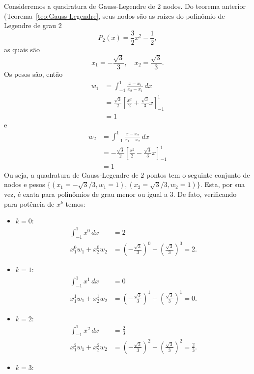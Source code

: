 \begin{ex}
  Consideremos a quadratura de Gauss-Legendre de $2$ nodos. Do teorema anterior (Teorema~\ref{teo:Gauss-Legendre}, seus nodos são as raízes do polinômio de Legendre de grau 2
  \begin{equation}
    P_2(x) = \frac{3}{2}x^2 - \frac{1}{2},
  \end{equation}
as quais são
\begin{equation}
  x_1 = -\frac{\sqrt{3}}{3},\quad x_2=\frac{\sqrt{3}}{3}.
\end{equation}
Os pesos são, então
\begin{align}
  w_1 &= \int_{-1}^1 \frac{x-x_1}{x_2-x_1}\,dx \\
  &= \frac{\sqrt{3}}{2}\left[\frac{x^2}{2}+\frac{\sqrt{3}}{3}x\right]_{-1}^1\\
  &= 1
\end{align}
e
\begin{align}
  w_2 &= \int_{-1}^1 \frac{x-x_2}{x_1-x_2}\,dx \\
  &= -\frac{\sqrt{3}}{2}\left[\frac{x^2}{2}-\frac{\sqrt{3}}{3}x\right]_{-1}^1\\
  &= 1
\end{align}
Ou seja, a quadratura de Gauss-Legendre de $2$ pontos tem o seguinte conjunto de nodos e pesos $\{(x_1=-\sqrt{3}/3, w_1=1), (x_2=\sqrt{3}/3, w_2=1)\}$. Esta, por sua vez, é exata para polinômios de grau menor ou igual a $3$. De fato, verificando para potência de $x^k$ temos:
\begin{itemize}
\item $k=0$:
  \begin{align}
    \int_{-1}^1 x^0\,dx &= 2\\
    x_1^0w_1 + x_2^0w_2 &= \left(-\frac{\sqrt{3}}{3}\right)^0 + \left(\frac{\sqrt{3}}{3}\right)^0 = 2.
  \end{align}
\item $k=1$:
  \begin{align}
    \int_{-1}^1 x^1\,dx &= 0\\
    x_1^1w_1 + x_2^1w_2 &= \left(-\frac{\sqrt{3}}{3}\right)^1 + \left(\frac{\sqrt{3}}{3}\right)^1 = 0.
  \end{align}
\item $k=2$:
  \begin{align}
    \int_{-1}^1 x^2\,dx &= \frac{2}{3}\\
    x_1^2w_1 + x_2^2w_2 &= \left(-\frac{\sqrt{3}}{3}\right)^2 + \left(\frac{\sqrt{3}}{3}\right)^2 = \frac{2}{3}.
  \end{align}
\item $k=3$:

\end{itemize}
\end{ex}
